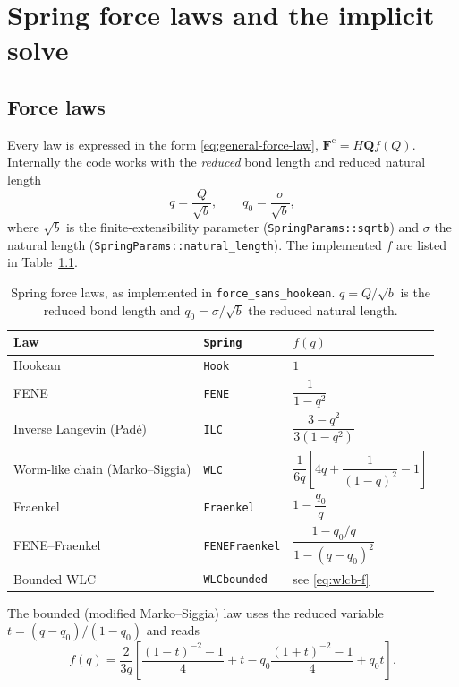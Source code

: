\documentclass[11pt,a4paper]{report}
\newcommand{\Q}{\bm{Q}}
\newcommand{\code}[1]{\texttt{\seqsplitcode{#1}}}
\newcommand{\seqsplitcode}[1]{#1}
\begin{document}
\chapter{Spring force laws and the implicit solve}
\label{ch:springs}

\section{Force laws}

Every law is expressed in the form \eqref{eq:general-force-law},
$\bm{F}^{\mathrm{c}} = H\Q f(Q)$. Internally the code works with the
\emph{reduced} bond length and reduced natural length
\begin{equation}
  q = \frac{Q}{\sqrt{b}}, \qquad q_0 = \frac{\sigma}{\sqrt{b}},
\end{equation}
where $\sqrt{b}$ is the finite-extensibility parameter (\code{SpringParams::sqrtb})
and $\sigma$ the natural length (\code{SpringParams::natural\_length}). The
implemented $f$ are listed in Table~\ref{tab:force-laws}.

\begin{table}[ht]
\centering
\caption{Spring force laws, as implemented in \code{force\_sans\_hookean}.
$q=Q/\sqrt{b}$ is the reduced bond length and $q_0=\sigma/\sqrt{b}$ the reduced
natural length.}
\label{tab:force-laws}
\begin{tabular}{@{}lll@{}}
\toprule
Law & \code{Spring} & $f(q)$ \\
\midrule
Hookean & \code{Hook} & $1$ \\[0.4em]
FENE & \code{FENE} & $\dfrac{1}{1-q^2}$ \\[0.7em]
Inverse Langevin (Pad\'e) & \code{ILC} & $\dfrac{3-q^2}{3\left(1-q^2\right)}$ \\[0.7em]
Worm-like chain (Marko--Siggia) & \code{WLC} &
  $\dfrac{1}{6q}\left[4q + \dfrac{1}{(1-q)^2} - 1\right]$ \\[0.7em]
Fraenkel & \code{Fraenkel} & $1 - \dfrac{q_0}{q}$ \\[0.7em]
FENE--Fraenkel & \code{FENEFraenkel} &
  $\dfrac{1-q_0/q}{1-(q-q_0)^2}$ \\[0.7em]
Bounded WLC & \code{WLCbounded} & see \eqref{eq:wlcb-f} \\
\bottomrule
\end{tabular}
\end{table}

The bounded (modified Marko--Siggia) law uses the reduced variable
$t = (q-q_0)/(1-q_0)$ and reads
\begin{equation}
  f(q) = \frac{2}{3q}\left[
    \frac{(1-t)^{-2}-1}{4} + t
    - q_0\frac{(1+t)^{-2}-1}{4} + q_0 t
  \right].
  \label{eq:wlcb-f}
\end{equation}
\end{document}
